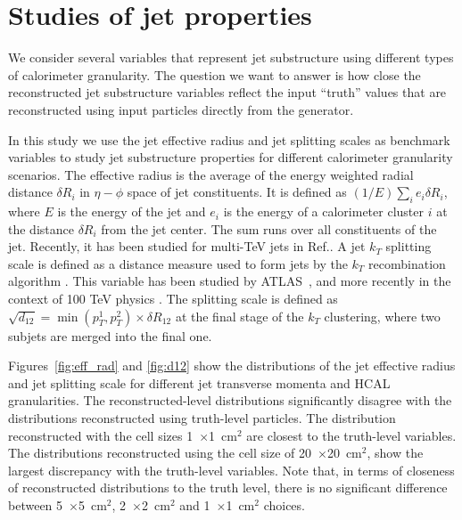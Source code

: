 \section{Studies of jet properties}
\label{sec:jets}

We consider several variables that represent jet substructure using different types
of calorimeter granularity. The question we want to answer is how close the reconstructed
jet substructure variables reflect the input ``truth'' values  that are reconstructed using 
input particles directly from the \pythia generator.

In this study we use the jet effective radius and jet splitting scales as benchmark variables
to study jet substructure properties for different calorimeter granularity scenarios. 
The effective radius is the average of the energy weighted radial distance $\delta R_i$ in $\eta-\phi$ space of jet constituents.
It is defined as $(1/E) \sum_i e_i \delta R_i$, where $E$ is the energy of the jet and $e_i$ is the energy of a calorimeter 
cluster $i$ at the distance $\delta R_i$ from the jet center. The sum runs over all constituents of the jet. 
Recently, it has been studied for multi-TeV jets in Ref.\cite{Auerbach:2014xua}.
A jet $k_T$ splitting scale \cite{Butterworth:2002tt} is defined as a distance measure
used to form jets by the $k_T$ recombination
algorithm \cite{Catani1993187,Ellis:1993tq}.
This variable has been studied by ATLAS~\cite{ATLAS:2012am}, and more recently in the context of 100 TeV physics \cite{Auerbach:2014xua}.
The splitting scale is defined as 
$\sqrt{d_{12}}=\min(p_T^1,p_T^2) \times \delta R_{12}$ \cite{ATLAS:2012am} at the final stage of the $k_T$ clustering, where two subjets are merged into the final one.

Figures~\ref{fig:eff_rad} and  \ref{fig:d12} show the distributions of 
the jet effective radius and jet splitting scale for  different jet transverse momenta and HCAL granularities. 
The reconstructed-level distributions significantly disagree with the distributions  
reconstructed using truth-level particles. The distribution reconstructed with the cell
sizes 1~$\times$1~cm$^2$ are closest to the truth-level variables. The distributions 
reconstructed using the cell size of 20~$\times$20~cm$^2$, 
show the largest discrepancy with the
truth-level variables. Note that, in terms of closeness of reconstructed distributions to the truth level, 
there is no significant difference between 5~$\times$5~cm$^2$,  2~$\times$2~cm$^2$ and  1~$\times$1~cm$^2$ choices. 

